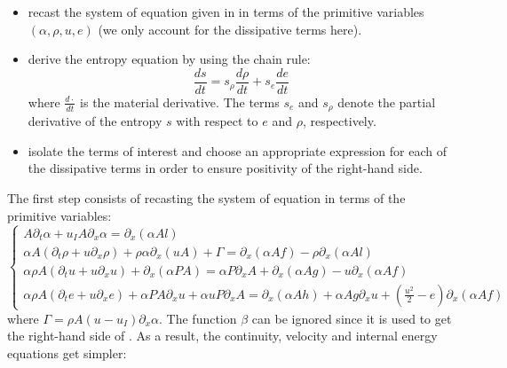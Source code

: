 \begin{itemize}
\item recast the system of equation given in  in terms of the primitive variables $(\alpha, \rho, u, e)$ (we only account for the dissipative terms here). 
\item derive the entropy equation by using the chain rule:
\begin{equation}
\label{eq:chain_rule}
\frac{ds}{dt} = s_{\rho} \frac{d \rho}{dt} + s_{e} \frac{d e}{dt} 
\end{equation}
where $\frac{d \cdot}{dt}$ is the material derivative. The terms $s_e$ and $s_{\rho}$ denote the partial derivative of the entropy $s$ with respect to $e$ and $\rho$, respectively.
\item isolate the terms of interest and choose an appropriate expression for each of the dissipative terms in order to ensure positivity of the right-hand side.
\end{itemize}
The first step consists of recasting the system of equation in terms of the primitive variables:
\begin{equation}
\label{eq:sev_equ3-bis}
\left\{
\begin{array}{llll}
A \partial_t  \alpha + u_I A \partial_x \alpha =  \partial_x \left( \alpha A l \right)\\
\alpha A \left( \partial_t \rho + u \partial_x  \rho \right) + \rho \alpha \partial_x \left( u A \right) + \Gamma = \partial_x\left( \alpha A f \right) - \rho \partial_x \left( \alpha A l \right) \\
\alpha \rho A \left( \partial_t u + u \partial_x u \right)  + \partial_x \left(\alpha P A \right) =  \alpha P \partial_x A + \partial_x\left( \alpha A g \right) - u \partial_x \left( \alpha A f \right) \\
\alpha \rho A  \left( \partial_t e +u  \partial_x e \right) + \alpha P A \partial_x u + \alpha u P \partial_x A = \partial_x \left( \alpha A h \right) + \alpha A g \partial_x u + \left( \frac{u^2}{2}-e \right) \partial_x \left( \alpha A f \right)
\end{array}
\right.
\end{equation}
where $\Gamma=\rho A \left( u - u_I  \right)\partial_x \alpha$. The function $\beta$ can be ignored since it is used to get the right-hand side of  . As a result, the continuity, velocity and internal energy equations get simpler:
